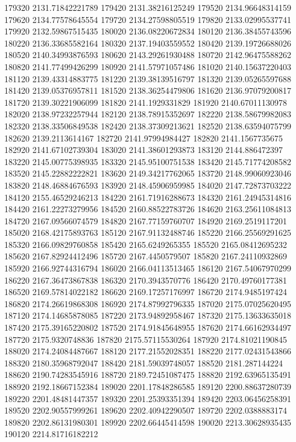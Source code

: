 {179320 2131.71842221789
179420 2131.38216125249
179520 2134.96648314159
179620 2134.77578645554
179720 2134.27598805519
179820 2133.02995537741
179920 2132.59867515435
180020 2136.08220672834
180120 2136.38455743596
180220 2136.33685582164
180320 2137.19403559552
180420 2139.19726688026
180520 2140.34993876593
180620 2143.29261930488
180720 2142.96475588262
180820 2141.77499426299
180920 2141.57971057486
181020 2140.15637220403
181120 2139.43314883775
181220 2139.38139516797
181320 2139.05265597688
181420 2139.05376957811
181520 2138.36254479806
181620 2136.97079200817
181720 2139.30221906099
181820 2141.1929331829
181920 2140.67011130978
182020 2138.97232257944
182120 2138.78915352697
182220 2138.58679982083
182320 2138.33506849538
182420 2138.37309213621
182520 2138.63594075799
182620 2139.2113614167
182720 2141.97994984427
182820 2141.1567735675
182920 2141.67102739304
183020 2141.38601293873
183120 2144.886472397
183220 2145.00775398935
183320 2145.95100751538
183420 2145.71774208582
183520 2145.22882222821
183620 2149.34217762065
183720 2148.99060923046
183820 2148.46884676593
183920 2148.45906959985
184020 2147.72873703222
184120 2155.46529246213
184220 2161.71916288673
184320 2161.24945314816
184420 2161.22273279956
184520 2160.88522783726
184620 2163.25611084813
184720 2167.09566074579
184820 2167.77159760707
184920 2169.2519117201
185020 2168.42175893763
185120 2167.91132488746
185220 2166.25569291625
185320 2166.09829760858
185420 2165.6249265355
185520 2165.08412695232
185620 2167.82924412496
185720 2167.4450579507
185820 2167.24110932869
185920 2166.92744316794
186020 2166.04113513465
186120 2167.54067970299
186220 2167.36473867838
186320 2170.3943570776
186420 2170.49760177381
186520 2169.57814022182
186620 2169.17257176997
186720 2174.9485197424
186820 2174.26619868308
186920 2174.87992796335
187020 2175.07025620495
187120 2174.14685878085
187220 2173.94892958467
187320 2175.13633635018
187420 2175.39165220802
187520 2174.91845648955
187620 2174.66162934497
187720 2175.9320748836
187820 2175.57115530264
187920 2174.81021190845
188020 2174.24084487667
188120 2177.21552028351
188220 2177.02431543866
188320 2180.35968792047
188420 2181.59039748057
188520 2181.287144224
188620 2190.74283545916
188720 2189.72451087475
188820 2192.63965135491
188920 2192.18667152384
189020 2201.17848286585
189120 2200.88637280739
189220 2201.48481447357
189320 2201.25393351394
189420 2203.06456258391
189520 2202.90557999261
189620 2202.40942290507
189720 2202.0388883174
189820 2202.86131980301
189920 2202.66445414598
190020 2213.30628935435
190120 2214.81716182212
}
